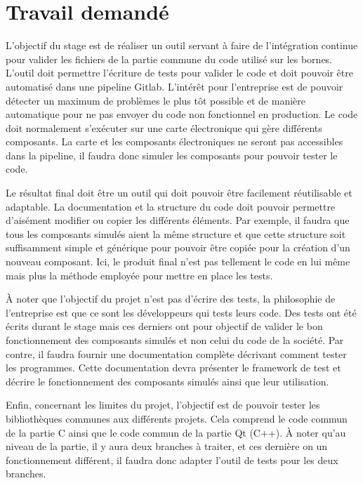 \documentclass[a4paper]{article}
\begin{document}
\section{Travail demandé}%

L'objectif du stage est de réaliser un outil servant à faire de l'intégration
continue pour valider les fichiers de la partie commune du code utilisé sur les
bornes. L'outil doit permettre l'écriture de tests pour valider le code et doit
pouvoir être automatisé dans une pipeline Gitlab. L'intérêt pour l'entreprise
est de pouvoir détecter un maximum de problèmes le plus tôt possible et de
manière automatique pour ne pas envoyer du code non fonctionnel en production.
Le code doit normalement s'exécuter sur une carte électronique qui gère
différents composants. La carte et les composants électroniques ne seront pas
accessibles dans la pipeline, il faudra donc simuler les composants pour pouvoir
tester le code.

Le résultat final doit être un outil qui doit pouvoir être facilement
réutilisable et adaptable. La documentation et la structure du code doit pouvoir
permettre d'aisément modifier ou copier les différents éléments. Par exemple, il
faudra que tous les composants simulés aient la même structure et que cette
structure soit suffisamment simple et générique pour pouvoir être copiée pour la
création d'un nouveau composant. Ici, le produit final n'est pas tellement le
code en lui même mais plus la méthode employée pour mettre en place les tests.

À noter que l'objectif du projet n'est pas d'écrire des tests, la philosophie de
l'entreprise est que ce sont les développeurs qui tests leurs code. Des tests
ont été écrits durant le stage mais ces derniers ont pour objectif de valider
le bon fonctionnement des composants simulés et non celui du code de la société.
Par contre, il faudra fournir une documentation complète décrivant comment
tester les programmes. Cette documentation devra présenter le framework de test
et décrire le fonctionnement des composants simulés ainsi que leur utilisation.

Enfin, concernant les limites du projet, l'objectif est de pouvoir tester les
bibliothèques communes aux différents projets. Cela comprend le code commun de
la partie C ainsi que le code commun de la partie Qt (C++). À noter qu'au niveau
de la partie, il y aura deux branches à traiter, et ces dernière on un
fonctionnement différent, il faudra donc adapter l'outil de tests pour les deux
branches.
\end{document}
